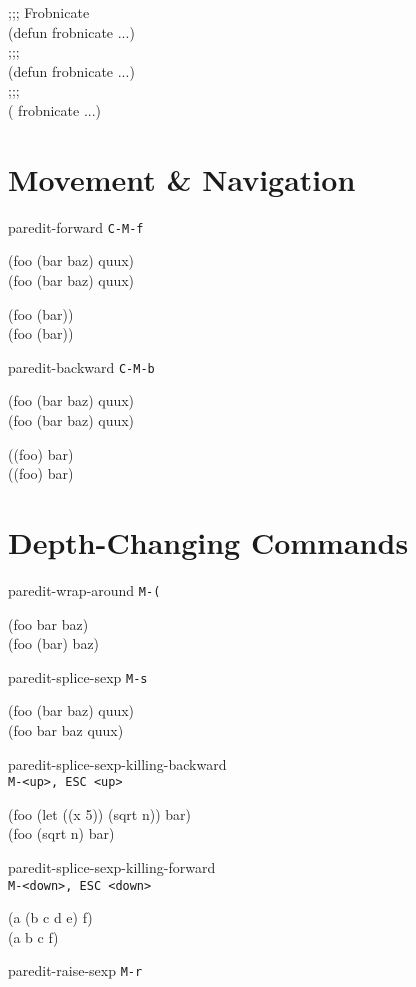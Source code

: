 \documentclass[10pt,landscape,a4paper]{article}
\begin{document}
\begin{multicols}{4}
{;;;\cursor{} Frobnicate\\
(defun frobnicate ...)\\
;;;\cursor\\
(defun frobnicate ...)\\
;;;\\
(\cursor{} frobnicate ...)
}

    \section*{\large{Movement \& Navigation}}

paredit-forward \texttt{C-M-f}

{\ttfamily
(foo \cursor(bar baz) quux)\\
(foo (bar baz)\cursor{} quux)

(foo (bar)\cursor)\\
(foo (bar))\cursor
}

paredit-backward \texttt{C-M-b}

{\ttfamily
(foo (bar baz)\cursor{} quux)\\
(foo \cursor(bar baz) quux)

(\cursor(foo) bar)\\
\cursor((foo) bar)
}

    \section*{\large{Depth-Changing Commands}}

paredit-wrap-around \texttt{M-(}

{\ttfamily
(foo \cursor bar baz)\\
(foo (\cursor bar) baz)
}

paredit-splice-sexp \texttt{M-s}

{\ttfamily
(foo (bar\cursor{} baz) quux)\\
(foo bar\cursor{} baz quux)
}

paredit-splice-sexp-killing-backward \\\texttt{M-<up>, ESC <up>}

{\ttfamily
(foo (let ((x 5)) \cursor(sqrt n)) bar)\\
(foo \cursor(sqrt n) bar)
}

paredit-splice-sexp-killing-forward \\\texttt{M-<down>, ESC <down>}

{\ttfamily
(a (b c\cursor{} d e) f)\\
(a b c\cursor{} f)
}

paredit-raise-sexp \texttt{M-r}


\end{multicols}
\end{document}
